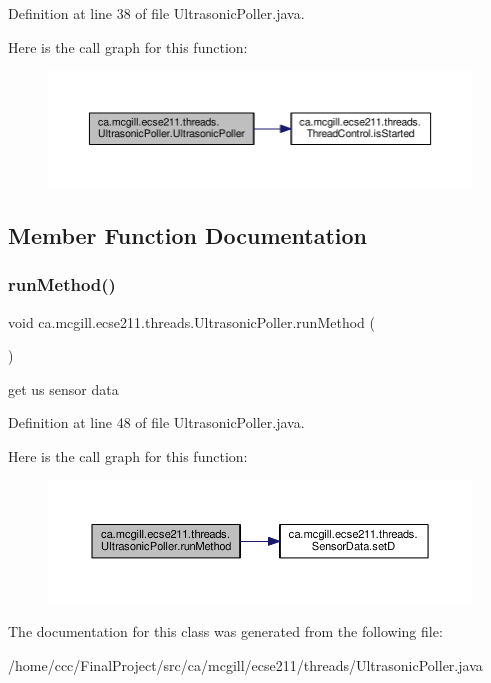 Definition at line 38 of file Ultrasonic\+Poller.\+java.

Here is the call graph for this function\+:
\nopagebreak
\begin{figure}[H]
\begin{center}
\leavevmode
\includegraphics[width=350pt]{classca_1_1mcgill_1_1ecse211_1_1threads_1_1_ultrasonic_poller_ac561f5d04e2b655a4509de8453c0cd07_cgraph}
\end{center}
\end{figure}


\subsection{Member Function Documentation}
\mbox{\label{classca_1_1mcgill_1_1ecse211_1_1threads_1_1_ultrasonic_poller_a8e6a84342aedc1b72741dbc2e80148c4}} 
\subsubsection{\texorpdfstring{run\+Method()}{runMethod()}}
{\footnotesize\ttfamily void ca.\+mcgill.\+ecse211.\+threads.\+Ultrasonic\+Poller.\+run\+Method (\begin{DoxyParamCaption}{ }\end{DoxyParamCaption})\hspace{0.3cm}{\ttfamily [protected]}}

get us sensor data 

Definition at line 48 of file Ultrasonic\+Poller.\+java.

Here is the call graph for this function\+:
\nopagebreak
\begin{figure}[H]
\begin{center}
\leavevmode
\includegraphics[width=350pt]{classca_1_1mcgill_1_1ecse211_1_1threads_1_1_ultrasonic_poller_a8e6a84342aedc1b72741dbc2e80148c4_cgraph}
\end{center}
\end{figure}


The documentation for this class was generated from the following file\+:\begin{DoxyCompactItemize}
\item 
/home/ccc/\+Final\+Project/src/ca/mcgill/ecse211/threads/Ultrasonic\+Poller.\+java\end{DoxyCompactItemize}
